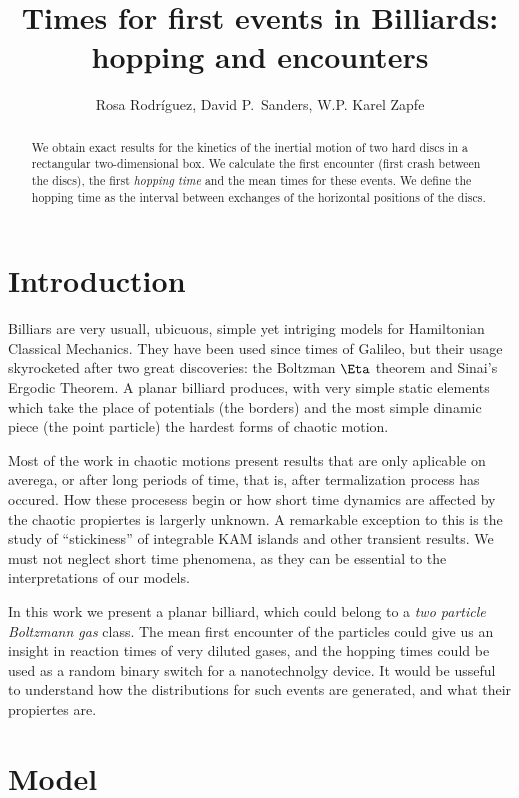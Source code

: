 \documentclass[letterpaper,10pt]{article}
\title{Times for first events in Billiards: hopping and encounters}
\author{Rosa Rodríguez,  David P.~Sanders, W.P. Karel Zapfe}
\affiliation{Departamento de Física, Facultad de Ciencias, Universidad Nacional Autónoma de México, Ciudad Universitaria, Del.~Coyoacán, México D.F. 04510, Mexico}
\begin{document}
\maketitle
\begin{abstract}
  We obtain exact results for the kinetics of the inertial motion of 
two hard discs in a rectangular two-dimensional box.
We calculate the first encounter (first crash between the discs),
the first \emph{hopping time} and the mean times for these events.
  We define the  hopping time as the interval 
 between exchanges of the horizontal positions of the discs.
\end{abstract}


\section{Introduction}

Billiars are very usuall, ubicuous, simple yet intriging models for
Hamiltonian Classical Mechanics. They have been used since times
of Galileo, but their usage skyrocketed after two great
discoveries: the Boltzman $\Eta$ theorem and Sinai's Ergodic
Theorem.  A planar billiard produces, with very simple static elements
which take the place of potentials (the borders) and the most simple
dinamic piece (the point particle) the hardest 
forms of chaotic motion. 

Most of the work in chaotic motions present results that
are only aplicable on averega, or after long periods of time, that is,
after termalization process has occured. How these procesess begin
or how short time dynamics are affected by the chaotic propiertes
is largerly unknown. A remarkable exception to this
is the study of ``stickiness'' of integrable KAM islands and other
transient results. 
We must not neglect short time phenomena, as they can be essential
to the interpretations of our models. 

In this work we present a planar billiard, which could belong
to a \emph{two particle Boltzmann gas} class. The mean first
encounter of the particles could give us an insight in
reaction times of very diluted gases, and the hopping times
could be used as a random binary switch for a nanotechnolgy device.
It would be usseful to understand how the distributions for
such events are generated, and what their propiertes are.


\section{Model}
\end{document}
